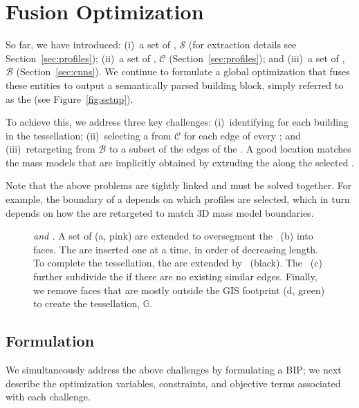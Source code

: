 \section{Fusion  Optimization}
\label{sec:globopt}





So far, we have introduced: 
(i)~a set of \sweepedges, $\mathcal{S}$ (for extraction details see Section~\ref{sec:profiles}); 
(ii)~a set of \cleanprofiles, $\mathcal{C}$ (Section~\ref{sec:profiles}); and 
(iii)~a set of \buildingfacades, $\mathcal{B}$ (Section~\ref{sec:cnns}).
We continue to formulate a global optimization that fuses these entities to output a semantically parsed building block, simply referred to as the \mbox{\em \outputM} (see Figure~\ref{fig:setup}). 

To achieve this, we address three key challenges: 
(i)~identifying \textit{\footprintpolygons} for each building in the \groundplane tessellation;
(ii)~selecting a \cleanprofile from $\mathcal{C}$ for each edge of every \footprintpolygon; and 
(iii)~retargeting \buildingfacades from $\mathcal{B}$ to a subset of the edges of the \footprintpolygons. A good \buildingfacade location matches the mass models that are implicitly obtained by extruding the \footprintpolygons along the selected \cleanprofiles.

 
Note that the above problems are tightly linked and must be solved together. For example, the boundary of a \footprintpolygon depends on which profiles are selected, which in turn depends on how the \buildingfacades are retargeted to match 3D mass model boundaries.


\begin{figure}[t!]
    \centering
  \def\svgwidth{\columnwidth}  
    
  \caption{{\it \Sweepedges and \softedges.} A set of \sweepedges (a, pink) are extended to oversegment the \groundplane~(b) into faces. The \sweepedges are inserted one at a time, in order of decreasing length. To complete the tessellation, the \sweepedges are extended by \emph{\softedges}~(black). The \buildingfacadepoints~(c) further subdivide the \groundplane if there are no existing similar edges. Finally, we remove faces that are mostly outside the GIS footprint (d, green) to create the tessellation, $\mathbb{G}$.}
  \label{fig:subdiv}
  \vnudge
\end{figure}


\subsection{Formulation}
\label{subsec:formulation}
We simultaneously address the above challenges by formulating a BIP; we next describe the optimization variables, constraints, and objective terms associated with each challenge.

